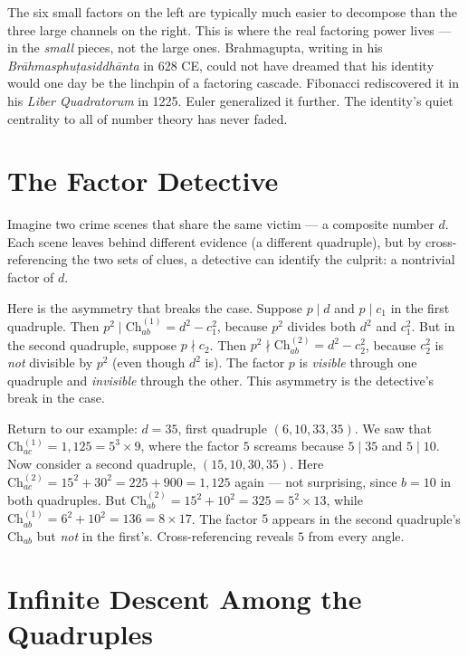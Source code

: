 \documentclass[11pt,twoside,openright]{book}
\theoremstyle{definition}
\theoremstyle{remark}
\begin{document}
The six small factors on the left are typically much easier to decompose than the three large channels on the right. This is where the real factoring power lives --- in the \textit{small} pieces, not the large ones. Brahmagupta, writing in his \textit{Brāhmasphuṭasiddhānta} in 628 CE, could not have dreamed that his identity would one day be the linchpin of a factoring cascade. Fibonacci rediscovered it in his \textit{Liber Quadratorum} in 1225. Euler generalized it further. The identity's quiet centrality to all of number theory has never faded.



\section{The Factor Detective}

Imagine two crime scenes that share the same victim --- a composite number $d$. Each scene leaves behind different evidence (a different quadruple), but by cross-referencing the two sets of clues, a detective can identify the culprit: a nontrivial factor of $d$.

Here is the asymmetry that breaks the case. Suppose $p \mid d$ and $p \mid c_1$ in the first quadruple. Then $p^2 \mid \mathrm{Ch}_{ab}^{(1)} = d^2 - c_1^2$, because $p^2$ divides both $d^2$ and $c_1^2$. But in the second quadruple, suppose $p \nmid c_2$. Then $p^2 \nmid \mathrm{Ch}_{ab}^{(2)} = d^2 - c_2^2$, because $c_2^2$ is \textit{not} divisible by $p^2$ (even though $d^2$ is). The factor $p$ is \textit{visible} through one quadruple and \textit{invisible} through the other. This asymmetry is the detective's break in the case.

Return to our example: $d = 35$, first quadruple $(6, 10, 33, 35)$. We saw that $\mathrm{Ch}_{ac}^{(1)} = 1{,}125 = 5^3 \times 9$, where the factor $5$ screams because $5 \mid 35$ and $5 \mid 10$. Now consider a second quadruple, $(15, 10, 30, 35)$. Here $\mathrm{Ch}_{ac}^{(2)} = 15^2 + 30^2 = 225 + 900 = 1{,}125$ again --- not surprising, since $b = 10$ in both quadruples. But $\mathrm{Ch}_{ab}^{(2)} = 15^2 + 10^2 = 325 = 5^2 \times 13$, while $\mathrm{Ch}_{ab}^{(1)} = 6^2 + 10^2 = 136 = 8 \times 17$. The factor $5$ appears in the second quadruple's $\mathrm{Ch}_{ab}$ but \textit{not} in the first's. Cross-referencing reveals $5$ from every angle.



\section{Infinite Descent Among the Quadruples}
\end{document}
